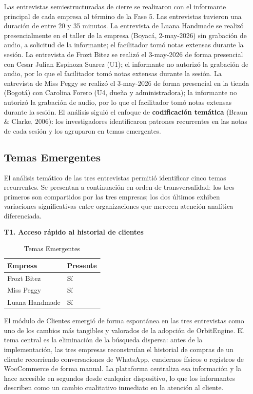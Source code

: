 Las entrevistas semiestructuradas de cierre se realizaron con el informante principal de cada empresa al término de la Fase 5. Las entrevistas tuvieron una duración de entre 20 y 35 minutos. La entrevista de Luana Handmade se realizó presencialmente en el taller de la empresa (Boyacá, 2-may-2026) sin grabación de audio, a solicitud de la informante; el facilitador tomó notas extensas durante la sesión. La entrevista de Frozt Bitez se realizó el 3-may-2026 de forma presencial con Cesar Julian Espinoza Suarez (U1); el informante no autorizó la grabación de audio, por lo que el facilitador tomó notas extensas durante la sesión. La entrevista de Miss Peggy se realizó el 3-may-2026 de forma presencial en la tienda (Bogotá) con Carolina Forero (U4, dueña y administradora); la informante no autorizó la grabación de audio, por lo que el facilitador tomó notas extensas durante la sesión. El análisis siguió el enfoque de \textbf{codificación temática} (Braun \& Clarke, 2006): los investigadores identificaron patrones recurrentes en las notas de cada sesión y los agruparon en temas emergentes.

\subsection{Temas Emergentes}\label{temas-emergentes}

El análisis temático de las tres entrevistas permitió identificar cinco temas recurrentes. Se presentan a continuación en orden de transversalidad: los tres primeros son compartidos por las tres empresas; los dos últimos exhiben variaciones significativas entre organizaciones que merecen atención analítica diferenciada.

\textbf{T1. Acceso rápido al historial de clientes}

\begin{longtable}[]{@{}ll@{}}
\caption[Temas Emergentes]{Temas Emergentes}\tabularnewline
\toprule\noalign{}
Empresa & Presente \\
\midrule\noalign{}
\endhead
\bottomrule\noalign{}
\endlastfoot
Frozt Bitez & Sí \\
Miss Peggy & Sí \\
Luana Handmade & Sí \\
\end{longtable}

El módulo de Clientes emergió de forma espontánea en las tres entrevistas como uno de los cambios más tangibles y valorados de la adopción de OrbitEngine. El tema central es la eliminación de la búsqueda dispersa: antes de la implementación, las tres empresas reconstruían el historial de compras de un cliente recorriendo conversaciones de WhatsApp, cuadernos físicos o registros de WooCommerce de forma manual. La plataforma centraliza esa información y la hace accesible en segundos desde cualquier dispositivo, lo que los informantes describen como un cambio cualitativo inmediato en la atención al cliente.

